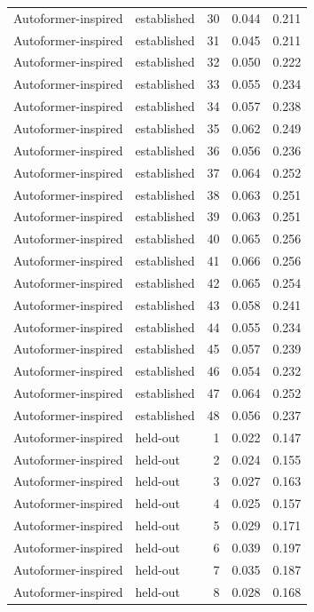 \begin{tabular}{llrrr}
Autoformer-inspired & established & 30 & 0.044 & 0.211 \\
Autoformer-inspired & established & 31 & 0.045 & 0.211 \\
Autoformer-inspired & established & 32 & 0.050 & 0.222 \\
Autoformer-inspired & established & 33 & 0.055 & 0.234 \\
Autoformer-inspired & established & 34 & 0.057 & 0.238 \\
Autoformer-inspired & established & 35 & 0.062 & 0.249 \\
Autoformer-inspired & established & 36 & 0.056 & 0.236 \\
Autoformer-inspired & established & 37 & 0.064 & 0.252 \\
Autoformer-inspired & established & 38 & 0.063 & 0.251 \\
Autoformer-inspired & established & 39 & 0.063 & 0.251 \\
Autoformer-inspired & established & 40 & 0.065 & 0.256 \\
Autoformer-inspired & established & 41 & 0.066 & 0.256 \\
Autoformer-inspired & established & 42 & 0.065 & 0.254 \\
Autoformer-inspired & established & 43 & 0.058 & 0.241 \\
Autoformer-inspired & established & 44 & 0.055 & 0.234 \\
Autoformer-inspired & established & 45 & 0.057 & 0.239 \\
Autoformer-inspired & established & 46 & 0.054 & 0.232 \\
Autoformer-inspired & established & 47 & 0.064 & 0.252 \\
Autoformer-inspired & established & 48 & 0.056 & 0.237 \\
Autoformer-inspired & held-out & 1 & 0.022 & 0.147 \\
Autoformer-inspired & held-out & 2 & 0.024 & 0.155 \\
Autoformer-inspired & held-out & 3 & 0.027 & 0.163 \\
Autoformer-inspired & held-out & 4 & 0.025 & 0.157 \\
Autoformer-inspired & held-out & 5 & 0.029 & 0.171 \\
Autoformer-inspired & held-out & 6 & 0.039 & 0.197 \\
Autoformer-inspired & held-out & 7 & 0.035 & 0.187 \\
Autoformer-inspired & held-out & 8 & 0.028 & 0.168 \\

\end{tabular}

